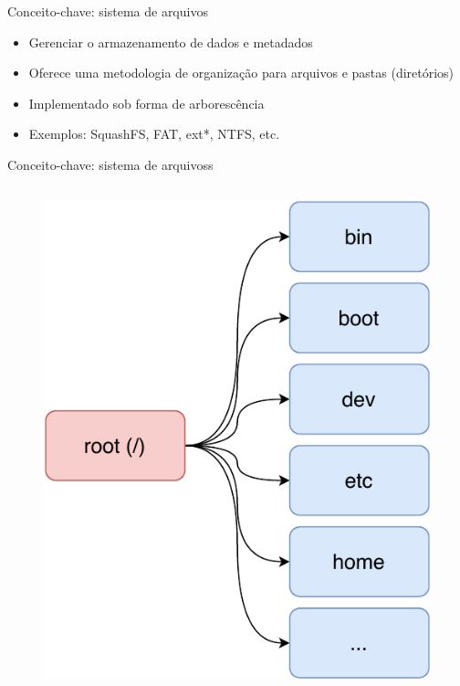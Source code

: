 \begin{frame}{Conceito-chave: sistema de arquivos}
    
    \begin{itemize}
        \item Gerenciar o armazenamento de dados e metadados
        \item Oferece uma metodologia de organização para arquivos e pastas (diretórios)
        \item Implementado sob forma de arborescência
        \item Exemplos: SquashFS, FAT, ext*, NTFS, etc.
    \end{itemize}
    
\end{frame}

\begin{frame}{Conceito-chave: sistema de arquivoss}
    \begin{columns}
    \begin{column}{0.5\textwidth}
    \begin{figure}
        \centering
        \includegraphics[scale=0.4]{figuras/FHS.pdf}

\end{figure}
\end{column}
\end{columns}
\end{frame}
